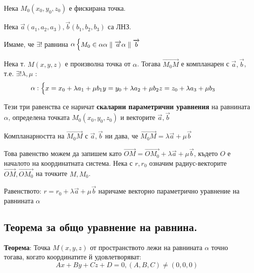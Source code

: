 \documentclass{article}
\renewcommand{\\}{\newline}
\begin{document}
Нека \(M_{0}(x_0, y_0, z_0)\) е фискирана точка. 

Нека \(\overrightarrow{a}(a_1, a_2, a_3), \overrightarrow{b}(b_1, b_2, b_3)\) са ЛНЗ. 

Имаме, че \(\exists !\) равнина \(\alpha \begin{cases} M_0 \in \alpha \\ \alpha \parallel \overrightarrow{a} \\ \alpha \parallel \overrightarrow{b} \end{cases}\)   

Нека т. \(M(x, y, z)\) е произволна точка от \(\alpha\). Тогава \(\overrightarrow{M_0M}\) е компланарен с \(\overrightarrow{a}, \overrightarrow{b}\), т.е. \(\exists ! \lambda, \mu\) : \[
  \alpha: \begin{cases}
    x = x_0 + \lambda a_1 + \mu b_1\\
    y = y_0 + \lambda a_2 + \mu b_2\\
    z = z_0 + \lambda a_3 + \mu b_3
  \end{cases}
\]      

Тези три равенства се наричат \textbf{скаларни параметрични уравнения} на равнината \(\alpha\), определена  точката \(M_0(x_0, y_0, z_0)\) и векторите \(\overrightarrow{a}, \overrightarrow{b}\)    

Компланарността на \(\overrightarrow{M_0M}\) с \(\overrightarrow{a}, \overrightarrow{b}\) ни дава, че \(\overrightarrow{M_0M} = \lambda \overrightarrow{a} + \mu \overrightarrow{b}\)  

Това равенство можем да запишем като \(\overrightarrow{OM} = \overrightarrow{OM_0} + \lambda \overrightarrow{a} + \mu \overrightarrow{b}\), където \(O\) е началото на координатната система. Нека с \(r, r_0\) означим радиус-векторите \(\overrightarrow{OM}, \overrightarrow{OM_0}\) на точките \(M, M_0\). 


Равенството: \(r = r_0 + \lambda \overrightarrow{a} + \mu \overrightarrow{b}\) наричаме векторно параметрично уравнение на равнината \(\alpha\)  

\subsection{Теорема за общо уравнение на равнина.}

\textbf{Теорема}: Точка \(M(x, y, z)\) от пространството лежи на равнината \(\alpha\) точно тогава, когато координатите й удовлетворяват: \[
  Ax + By + Cz + D = 0, (A, B, C) \not= (0,0,0)
\] 
\end{document}
